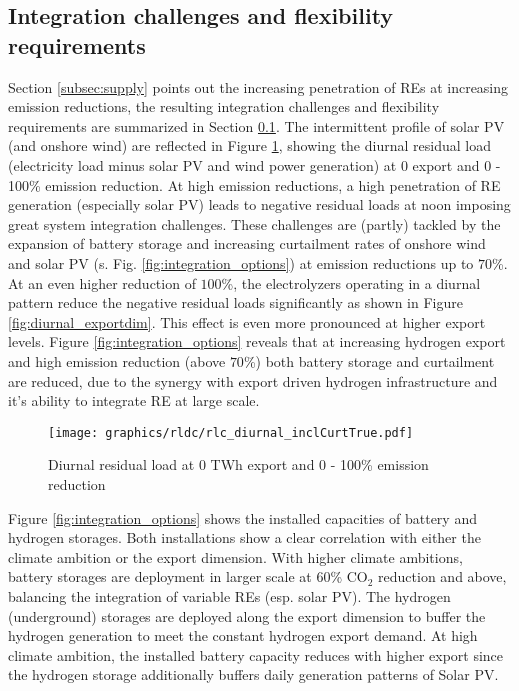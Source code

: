 \subsection{Integration challenges and flexibility requirements}
\label{subsec:integration_challenges}
Section \ref{subsec:supply} points out the increasing penetration of REs at increasing emission reductions, the resulting integration challenges and flexibility requirements are summarized in Section \ref{subsec:integration_challenges}. The intermittent profile of solar PV (and onshore wind) are reflected in Figure \ref{fig:diurnal}, showing the diurnal residual load (electricity load minus solar PV and wind power generation) at 0 export and 0 - 100\% emission reduction. At high emission reductions, a high penetration of RE generation (especially solar PV) leads to negative residual loads at noon imposing great system integration challenges. These challenges are (partly) tackled by the expansion of battery storage and increasing curtailment rates of onshore wind and solar PV (s. Fig. \ref{fig:integration_options}) at emission reductions up to $70$\%. At an even higher reduction of $100$\%, the electrolyzers operating in a diurnal pattern reduce the negative residual loads significantly as shown in Figure \ref{fig:diurnal_exportdim}. This effect is even more pronounced at higher export levels. Figure \ref{fig:integration_options} reveals that at increasing hydrogen export and high emission reduction (above $70$\%) both battery storage and curtailment are reduced, due to the synergy with export driven hydrogen infrastructure and it's ability to integrate RE at large scale.

\begin{figure}[h!]
    \centering
    \texttt{[image: graphics/rldc/rlc\_diurnal\_inclCurtTrue.pdf]}
    \caption{Diurnal residual load at 0 TWh export and 0 - 100\% emission reduction}
    \label{fig:diurnal}
\end{figure}

Figure \ref{fig:integration_options} shows the installed capacities of battery and hydrogen storages. Both installations show a clear correlation with either the climate ambition or the export dimension. With higher climate ambitions, battery storages are deployment in larger scale at 60\% $\mathrm{CO_2}$ reduction and above, balancing the integration of variable REs (esp. solar PV). The hydrogen (underground) storages are deployed along the export dimension to buffer the hydrogen generation to meet the constant hydrogen export demand. At high climate ambition, the installed battery capacity reduces with higher export since the hydrogen storage additionally buffers daily generation patterns of Solar PV.

